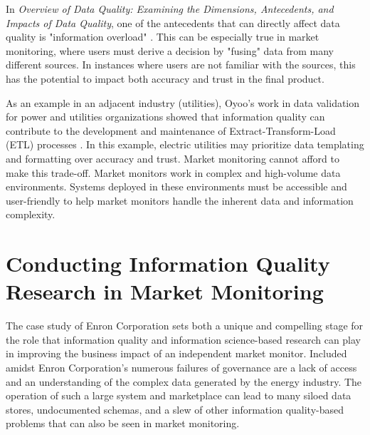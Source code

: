 
In \textit{Overview of Data Quality: Examining the Dimensions, Antecedents, and Impacts of Data Quality}, one of the antecedents that can directly affect data quality is "information overload" \cite{wang-et-all}. This can be especially true in market monitoring, where users must derive a decision by "fusing" data from many different sources. In instances where users are not familiar with the sources, this has the potential to impact both accuracy and trust in the final product.

As an example in an adjacent industry (utilities), Oyoo's work in data validation for power and utilities organizations showed that information quality can contribute to the development and maintenance of Extract-Transform-Load (ETL) processes \cite{oyoo}. In this example, electric utilities may prioritize data templating and formatting over accuracy and trust. Market monitoring cannot afford to make this trade-off. Market monitors work in complex and high-volume data environments. Systems deployed in these environments must be accessible and user-friendly to help market monitors handle the inherent data and information complexity.

\section{Conducting Information Quality Research in Market Monitoring}

The case study of Enron Corporation sets both a unique and compelling stage for the role that information quality and information science-based research can play in improving the business impact of an independent market monitor. Included amidst Enron Corporation’s numerous failures of governance are a lack of access and an understanding of the complex data generated by the energy industry. The operation of such a large system and marketplace can lead to many siloed data stores, undocumented schemas, and a slew of other information quality-based problems that can also be seen in market monitoring.

